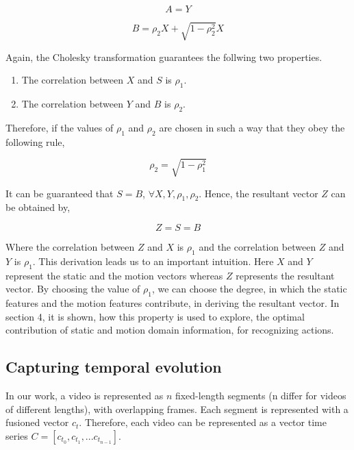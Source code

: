 \begin{equation}
A = Y
\end{equation}

\begin{equation}
B = \rho_{2} X + \sqrt{1-\rho_{2}^2}X
\end{equation}

Again, the Cholesky transformation guarantees the follwing two properties.


\begin{enumerate}
  \item The correlation between $X$ and $S$ is $\rho_{1}$.
  \item The correlation between $Y$ and $B$ is $\rho_{2}$.
\end{enumerate}

Therefore, if the values of $\rho_{1}$ and $\rho_{2}$ are chosen in such a way that they obey the following
rule,

\begin{equation}
\rho_{2} = \sqrt{1-\rho_{1}^2}
\end{equation}

It can be guaranteed that $S = B$, $\forall X,Y,\rho_{1},\rho_{2}$. Hence, the resultant vector $Z$ can be obtained
by,

\begin{equation}
Z=S=B
\end{equation}

Where the correlation between $Z$ and $X$ is $\rho_{1}$ and the correlation between $Z$ and $Y$ is $\rho_{1}$. This derivation 
leads us to an important intuition. Here $X$ and $Y$ represent the static and the
motion vectors whereas $Z$ represents the resultant vector. By choosing the value of $\rho_{1}$, we can
choose the degree, in which the static features and the motion features contribute,
in deriving the resultant vector. In section 4, it is shown, how this property is used to explore, the optimal contribution of 
static and motion domain information, for recognizing actions. 

\subsection{Capturing temporal evolution}
In our work, a video is represented as $n$
fixed-length segments (n differ for videos of different lengths),  with overlapping frames.  Each segment
is represented with a fusioned vector $c_{t}$. Therefore, each video can be represented as a vector time series 
$C = [c_{t_0},c_{t_1},...c_{t_{n-1}}]$. 

